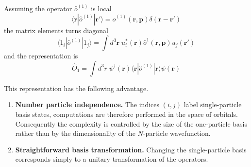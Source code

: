 \documentclass[../../../main.tex]{subfiles}
\begin{document}
Assuming the operator $\hat{o} ^{(1)}$ is local
\begin{equation*}
  \langle \mathbf{r}|\hat{o}^{(1)}|\mathbf{r}'\rangle  = \hat{o } ^{(1)}(\mathbf{r },\mathbf{p})\delta(\mathbf{r }-\mathbf{r}')
\end{equation*}
the matrix elements turns diagonal
\begin{equation*}
  \langle 1_i|\hat{o } ^{(1)}|1_j\rangle = \int d^3 \mathbf{r} \;u^*_{i}(\mathbf{r}) \hat{o }^{1}(\mathbf{r},\mathbf{p}) u_j(\mathbf{r}')
\end{equation*}
and the representation is
\begin{equation*}
  \hat{O}_1 = \int d^3r\;\psi^\dagger(\mathbf{r}) \langle \mathbf{r}|\hat{o}^{(1)}|\mathbf{r}\rangle \psi(\mathbf{r})
\end{equation*}

This representation has the following advantage.
\begin{enumerate}
  \item \textbf{Number particle independence.} The indices $(i,j)$ label single-particle basis states, computations are therefore performed in the space of orbitals. Consequently the complexity is controlled by the size of the one-particle basis rather than by the dimensionality of the $N$-particle wavefunction.
  \item \textbf{Straightforward basis transformation.} Changing the single-particle basis corresponds simply to a unitary transformation of the operators.
\end{enumerate}
\end{document}
